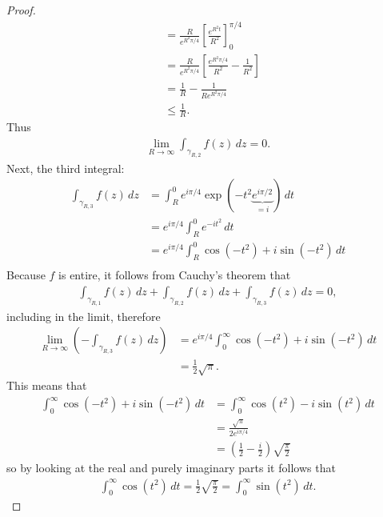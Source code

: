 \documentclass{article}
\begin{document}
\begin{proof}
\begin{align}
    &= \frac{R}{e^{R^2\pi/4}}\left[\frac{e^{R^2t}}{R^2}\right]_0^{\pi/4} \\
    &= \frac{R}{e^{R^2\pi/4}}\left[\frac{e^{R^2\pi/4}}{R^2} - \frac{1}{R^2}\right] \\
    &= \frac{1}{R} - \frac{1}{Re^{R^2\pi/4}} \\
    &\leq \frac{1}{R}.
  \end{align}
  Thus \begin{align}
    \lim_{R \rightarrow \infty}\int_{\gamma_{R,2}} f(z)\,dz = 0.
  \end{align}
  Next, the third integral: \begin{align}
    \int_{\gamma_{R,3}} f(z)\,dz
      &= \int_R^0 e^{i\pi/4}\exp(-t^2\underbrace{e^{i\pi/2}}_{=i})\,dt \\
      &= e^{i\pi/4}\int_R^0 e^{-it^2}\,dt \\
      &= e^{i\pi/4}\int_R^0 \cos(-t^2) + i \sin(-t^2)\,dt \\
  \end{align}
  Because $f$ is entire, it follows from Cauchy's theorem that \begin{align}
    \int_{\gamma_{R,1}} f(z)\,dz + \int_{\gamma_{R,2}} f(z)\,dz + \int_{\gamma_{R,3}} f(z)\,dz = 0,
  \end{align} including in the limit, therefore \begin{align}
    \lim_{R\rightarrow \infty}\left(-\int_{\gamma_{R,3}} f(z)\,dz\right)
      &= e^{i\pi/4}\int_0^\infty \cos(-t^2) + i \sin(-t^2)\,dt \\
      &= \frac{1}{2}\sqrt{\pi}.
  \end{align} This means that \begin{align}
    \int_0^\infty \cos(-t^2) + i \sin(-t^2)\,dt
    &= \int_0^\infty \cos(t^2) - i \sin(t^2)\,dt \\
    &= \frac{\sqrt{\pi}}{2e^{i\pi/4}} \\
    &= \left(\frac{1}{2} - \frac{i}{2}\right)\sqrt{\frac{\pi}{2}}
  \end{align}
    so by looking at the real and purely imaginary parts it follows that
    \begin{align}
    \int_0^\infty \cos(t^2)\,dt
      = \frac{1}{2}\sqrt{\frac{\pi}{2}}
      = \int_0^\infty \sin(t^2)\,dt.
  \end{align}
\end{proof}
\pagebreak
\end{document}
